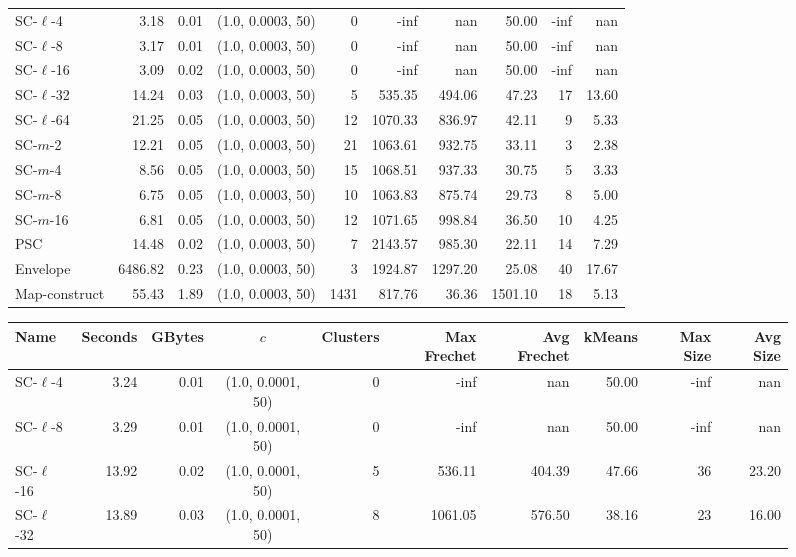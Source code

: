 \begin{figure}
\begin{center}
\begin{minipage}{\textwidth}
{\begin{tabular}{@{}lrrcrrrrrr@{}}
        \midrule
        SC-$\ell$-4 & 3.18 & 0.01 & (1.0, 0.0003, 50) & 0 & -inf & nan & 50.00 & -inf & nan\\
        SC-$\ell$-8 & 3.17 & 0.01 & (1.0, 0.0003, 50) & 0 & -inf & nan & 50.00 & -inf & nan\\
        SC-$\ell$-16 & 3.09 & 0.02 & (1.0, 0.0003, 50) & 0 & -inf & nan & 50.00 & -inf & nan\\
        SC-$\ell$-32 & 14.24 & 0.03 & (1.0, 0.0003, 50) & 5 & 535.35 & 494.06 & 47.23 & 17 & 13.60\\
        SC-$\ell$-64 & 21.25 & 0.05 & (1.0, 0.0003, 50) & 12 & 1070.33 & 836.97 & 42.11 & 9 & 5.33\\
        SC-$m$-2 & 12.21 & 0.05 & (1.0, 0.0003, 50) & 21 & 1063.61 & 932.75 & 33.11 & 3 & 2.38\\
        SC-$m$-4 & 8.56 & 0.05 & (1.0, 0.0003, 50) & 15 & 1068.51 & 937.33 & 30.75 & 5 & 3.33\\
        SC-$m$-8 & 6.75 & 0.05 & (1.0, 0.0003, 50) & 10 & 1063.83 & 875.74 & 29.73 & 8 & 5.00\\
        SC-$m$-16 & 6.81 & 0.05 & (1.0, 0.0003, 50) & 12 & 1071.65 & 998.84 & 36.50 & 10 & 4.25\\
        PSC & 14.48 & 0.02 & (1.0, 0.0003, 50) & 7 & 2143.57 & 985.30 & 22.11 & 14 & 7.29\\
        Envelope & 6486.82 & 0.23 & (1.0, 0.0003, 50) & 3 & 1924.87 & 1297.20 & 25.08 & 40 & 17.67\\
        Map-construct & 55.43 & 1.89 & (1.0, 0.0003, 50) & 1431 & 817.76 & 36.36 & 1501.10 & 18 & 5.13\\
        \bottomrule
    \end{tabular}
    }
    {
    \begin{tabular}{@{}lrrcrrrrrr@{}}
        \toprule
        Name & Seconds & GBytes & $c$ & Clusters & Max Frechet & Avg Frechet & kMeans & Max Size & Avg Size\\
        \midrule
        SC-$\ell$-4 & 3.24 & 0.01 & (1.0, 0.0001, 50) & 0 & -inf & nan & 50.00 & -inf & nan\\
        SC-$\ell$-8 & 3.29 & 0.01 & (1.0, 0.0001, 50) & 0 & -inf & nan & 50.00 & -inf & nan\\
        SC-$\ell$-16 & 13.92 & 0.02 & (1.0, 0.0001, 50) & 5 & 536.11 & 404.39 & 47.66 & 36 & 23.20\\
        SC-$\ell$-32 & 13.89 & 0.03 & (1.0, 0.0001, 50) & 8 & 1061.05 & 576.50 & 38.16 & 23 & 16.00\\

\end{tabular}}
\end{minipage}
\end{center}
\end{figure}
